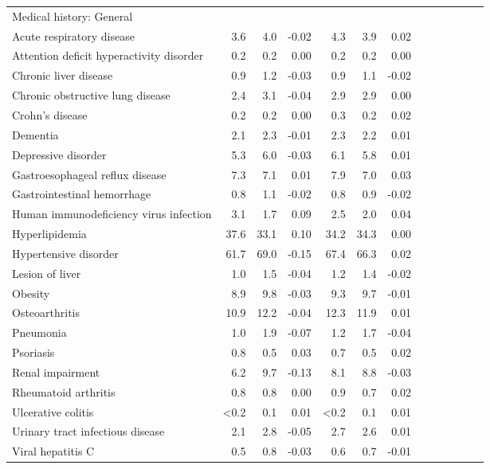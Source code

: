 \documentclass[11pt,]{article}
\begin{document}
\begin{longtable}{lrrrrrrrrrrrr}
  Medical history: General &    &    &     &    &    &     \\ 
      Acute respiratory disease &  3.6 &  4.0 & -0.02 &  4.3 &  3.9 &  0.02 \\ 
      Attention deficit hyperactivity disorder &  0.2 &  0.2 &  0.00 &  0.2 &  0.2 &  0.00 \\ 
      Chronic liver disease &  0.9 &  1.2 & -0.03 &  0.9 &  1.1 & -0.02 \\ 
      Chronic obstructive lung disease &  2.4 &  3.1 & -0.04 &  2.9 &  2.9 &  0.00 \\ 
      Crohn's disease &  0.2 &  0.2 &  0.00 &  0.3 &  0.2 &  0.02 \\ 
      Dementia &  2.1 &  2.3 & -0.01 &  2.3 &  2.2 &  0.01 \\ 
      Depressive disorder &  5.3 &  6.0 & -0.03 &  6.1 &  5.8 &  0.01 \\ 
      Gastroesophageal reflux disease &  7.3 &  7.1 &  0.01 &  7.9 &  7.0 &  0.03 \\ 
      Gastrointestinal hemorrhage &  0.8 &  1.1 & -0.02 &  0.8 &  0.9 & -0.02 \\ 
      Human immunodeficiency virus infection &  3.1 &  1.7 &  0.09 &  2.5 &  2.0 &  0.04 \\ 
      Hyperlipidemia & 37.6 & 33.1 &  0.10 & 34.2 & 34.3 &  0.00 \\ 
      Hypertensive disorder & 61.7 & 69.0 & -0.15 & 67.4 & 66.3 &  0.02 \\ 
      Lesion of liver &  1.0 &  1.5 & -0.04 &  1.2 &  1.4 & -0.02 \\ 
      Obesity &  8.9 &  9.8 & -0.03 &  9.3 &  9.7 & -0.01 \\ 
      Osteoarthritis & 10.9 & 12.2 & -0.04 & 12.3 & 11.9 &  0.01 \\ 
      Pneumonia &  1.0 &  1.9 & -0.07 &  1.2 &  1.7 & -0.04 \\ 
      Psoriasis &  0.8 &  0.5 &  0.03 &  0.7 &  0.5 &  0.02 \\ 
      Renal impairment &  6.2 &  9.7 & -0.13 &  8.1 &  8.8 & -0.03 \\ 
      Rheumatoid arthritis &  0.8 &  0.8 &  0.00 &  0.9 &  0.7 &  0.02 \\ 
      Ulcerative colitis & <0.2 &  0.1 &  0.01 & <0.2 &  0.1 &  0.01 \\ 
      Urinary tract infectious disease &  2.1 &  2.8 & -0.05 &  2.7 &  2.6 &  0.01 \\ 
      Viral hepatitis C &  0.5 &  0.8 & -0.03 &  0.6 &  0.7 & -0.01 \\ 

\end{longtable}
\end{document}
